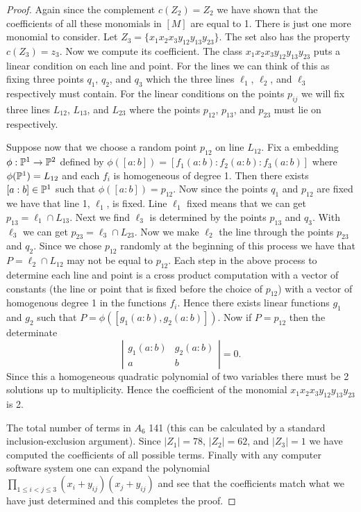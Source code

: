 \documentclass[12pt]{article}
\theoremstyle{plain}
\theoremstyle{definition}
\renewcommand{\P}{\ensuremath \mathbb{P}}
\begin{document}
\begin{proof}
Again since the complement $c(Z_2)=Z_2$ we have shown that the coefficients of all these monomials in $[M]$ are equal to 1. There is just one more monomial to consider. Let $Z_3=\{x_1x_2x_3y_{12}y_{13}y_{23}\}$. The set also has the property $c(Z_3)=z_3$. Now we compute its coefficient. The class $x_1x_2x_3y_{12}y_{13}y_{23}$ puts a linear condition on each line and point. For the lines we can think of this as fixing three points $q_1$, $q_2$, and $q_3$ which the three lines $\ell_1$, $\ell_2$, and $\ell_3$ respectively must contain. For the linear conditions on the points $p_{ij}$ we will fix three lines $L_{12}$, $L_{13}$, and $L_{23}$ where the points $p_{12}$, $p_{13}$, and $p_{23}$ must lie on respectively. 

Suppose now that we choose a random point $p_{12}$ on line $L_{12}$. Fix a embedding $\phi :\P^1\to \P^2$ defined by $\phi([a:b])=[f_1(a:b):f_2(a:b):f_3(a:b)]$ where $\phi(\P^1)=L_{12}$ and each $f_i$ is homogeneous of degree 1. Then there exists $[a:b]\in \P^1$ such that $\phi ([a:b])=p_{12}$. Now since the points $q_1$ and $p_{12}$ are fixed we have that line 1, $\ell_1$, is fixed. Line $\ell_1$ fixed means that we can get $p_{13}=\ell_1\cap L_{13}$. Next we find $\ell_3$ is determined by the points $p_{13}$ and $q_3$. With $\ell_3$ we can get $p_{23}=\ell_3\cap L_{23}$. Now we make $\ell_2$ the line through the points $p_{23}$ and $q_2$. Since we chose $p_{12}$ randomly at the beginning of this process we have that $P=\ell_2\cap L_{12}$ may not be equal to $p_{12}$. Each step in the above process to determine each line and point is a cross product computation with a vector of constants (the line or point that is fixed before the choice of $p_{12}$) with a vector of homogenous degree 1 in the functions $f_i$. Hence there exists linear functions $g_1$ and $g_2$ such that $P=\phi([g_1(a:b),g_2(a:b)])$. Now if $P=p_{12}$ then the determinate $$\left| \begin{array}{cc} g_1(a:b)&g_2(a:b)\\
a&b
\end{array}\right| =0.$$ Since this a homogeneous quadratic polynomial of two variables there must be 2 solutions up to multiplicity. Hence the coefficient of the monomial $x_1x_2x_3y_{12}y_{13}y_{23}$ is 2.

The total number of terms in $A_6$ 141 (this can be calculated by a standard inclusion-exclusion argument). Since $|Z_1|=78$, $|Z_2|=62$, and $|Z_3|=1$ we have computed the coefficients of all possible terms. Finally with any computer software system one can expand the polynomial $\prod_{1 \leq i < j \leq 3} (x_i 
+ y_{ij})(x_j + y_{ij})$ and see that the coefficients match what we have just determined and this completes the proof. \end{proof}
\end{document}
